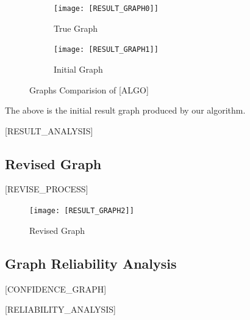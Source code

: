 \documentclass{article}
\begin{document}
\begin{figure}[H]
    \centering
    \begin{subfigure}{0.45\textwidth}
        \centering
        \vspace{-0.5cm}
        \texttt{[image: [RESULT\_GRAPH0]]}
        \vfill
        \caption{True Graph}
        \label{fig:sub1}
    \end{subfigure}
    \hspace{0.04\textwidth}
    \begin{subfigure}{0.45\textwidth}
        \centering
        \vspace{-0.5cm}
        \texttt{[image: [RESULT\_GRAPH1]]}
        \vfill
        \caption{Initial Graph}
        \label{fig:sub2}
    \end{subfigure}
    \label{fig:main}
    \caption{Graphs Comparision of [ALGO]}
\end{figure}

The above is the initial result graph produced by our algorithm.

[RESULT_ANALYSIS]

\subsection{Revised Graph}

\begin{minipage}[t]{0.6\linewidth}
    [REVISE_PROCESS]
\vfill
\end{minipage}
\hfill
\begin{minipage}[t]{0.4\linewidth}
    \begin{figure}[H]
        \centering
        \vspace{-0.5cm}
        \texttt{[image: [RESULT\_GRAPH2]]}
        \caption{\label{fig:corr}Revised Graph}
    \end{figure}
\end{minipage}


\subsection{Graph Reliability Analysis}

[CONFIDENCE_GRAPH]

[RELIABILITY_ANALYSIS]

\end{document}

